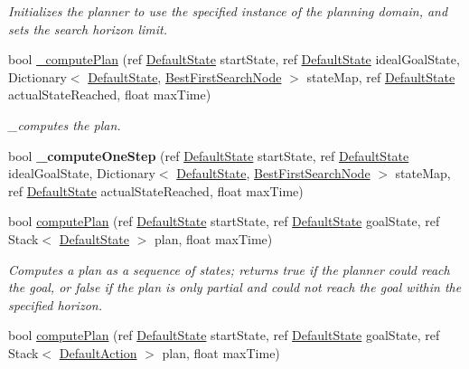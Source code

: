 \begin{DoxyCompactItemize}
\begin{DoxyCompactList}\small\item\em Initializes the planner to use the specified instance of the planning domain, and sets the search horizon limit. \end{DoxyCompactList}\item 
bool \hyperlink{class_best_first_search_planner_ab9066bb695cb64fc787f747a4972d878}{\-\_\-compute\-Plan} (ref \hyperlink{class_default_state}{Default\-State} start\-State, ref \hyperlink{class_default_state}{Default\-State} ideal\-Goal\-State, Dictionary$<$ \hyperlink{class_default_state}{Default\-State}, \hyperlink{class_best_first_search_node}{Best\-First\-Search\-Node} $>$ state\-Map, ref \hyperlink{class_default_state}{Default\-State} actual\-State\-Reached, float max\-Time)
\begin{DoxyCompactList}\small\item\em \-\_\-computes the plan. \end{DoxyCompactList}\item 
\hypertarget{class_best_first_search_planner_a97dc3cad80e236bde9c7d9c44759c7ba}{bool {\bfseries \-\_\-compute\-One\-Step} (ref \hyperlink{class_default_state}{Default\-State} start\-State, ref \hyperlink{class_default_state}{Default\-State} ideal\-Goal\-State, Dictionary$<$ \hyperlink{class_default_state}{Default\-State}, \hyperlink{class_best_first_search_node}{Best\-First\-Search\-Node} $>$ state\-Map, ref \hyperlink{class_default_state}{Default\-State} actual\-State\-Reached, float max\-Time)}\label{class_best_first_search_planner_a97dc3cad80e236bde9c7d9c44759c7ba}

\item 
\hypertarget{class_best_first_search_planner_a777fb06939a33b3f3effb24b0dbda076}{bool \hyperlink{class_best_first_search_planner_a777fb06939a33b3f3effb24b0dbda076}{compute\-Plan} (ref \hyperlink{class_default_state}{Default\-State} start\-State, ref \hyperlink{class_default_state}{Default\-State} goal\-State, ref Stack$<$ \hyperlink{class_default_state}{Default\-State} $>$ plan, float max\-Time)}\label{class_best_first_search_planner_a777fb06939a33b3f3effb24b0dbda076}

\begin{DoxyCompactList}\small\item\em Computes a plan as a sequence of states; returns true if the planner could reach the goal, or false if the plan is only partial and could not reach the goal within the specified horizon. \end{DoxyCompactList}\item 
\hypertarget{class_best_first_search_planner_a0367a0321408a4d7c9796739650b2bee}{bool \hyperlink{class_best_first_search_planner_a0367a0321408a4d7c9796739650b2bee}{compute\-Plan} (ref \hyperlink{class_default_state}{Default\-State} start\-State, ref \hyperlink{class_default_state}{Default\-State} goal\-State, ref Stack$<$ \hyperlink{class_default_action}{Default\-Action} $>$ plan, float max\-Time)}\label{class_best_first_search_planner_a0367a0321408a4d7c9796739650b2bee}


\end{DoxyCompactItemize}
